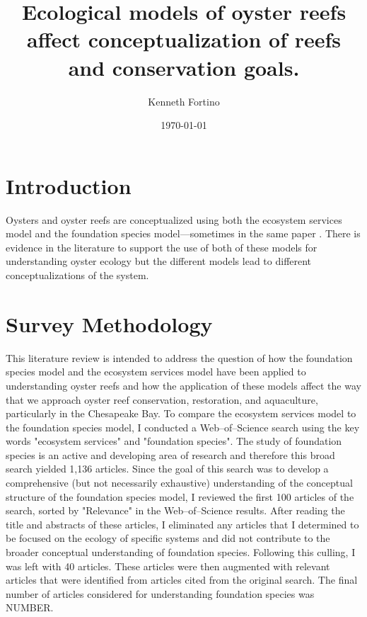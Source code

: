 \documentclass{article}
\begin{document}
\title{Ecological models of oyster reefs affect conceptualization of reefs and conservation goals.}
\author{Kenneth Fortino}
\date{\today}

\maketitle

\section*{Introduction}
\label{sec:intro}

Oysters and oyster reefs are conceptualized using both the ecosystem services model and the foundation species model---sometimes in the same paper \cite{mercaldo-allen_oyster_2023}. There is evidence in the literature to support the use of both of these models for understanding oyster ecology but the different models lead to different conceptualizations of the system. 

\section*{Survey Methodology}
\label{sec:surv_method}

This literature review is intended to address the question of how the foundation species model and the ecosystem services model have been applied to understanding oyster reefs and how the application of these models affect the way that we approach oyster reef conservation, restoration, and aquaculture, particularly in the Chesapeake Bay. To compare the ecosystem services model to the foundation species model, I conducted a Web--of--Science search using the key words "ecosystem services" and "foundation species". The study of foundation species is an active and developing area of research and therefore this broad search yielded 1,136 articles. Since the goal of this search was to develop a comprehensive (but not necessarily exhaustive) understanding of the conceptual structure of the foundation species model, I reviewed the first 100 articles of the search, sorted by "Relevance" in the Web--of--Science results. After reading the title and abstracts of these articles, I eliminated any articles that I determined to be focused on the ecology of specific systems and did not contribute to the broader conceptual understanding of foundation species. Following this culling, I was left with 40 articles. These articles were then augmented with relevant articles that were identified from articles cited from the original search. The final number of articles considered for understanding foundation species was NUMBER.
\end{document}
